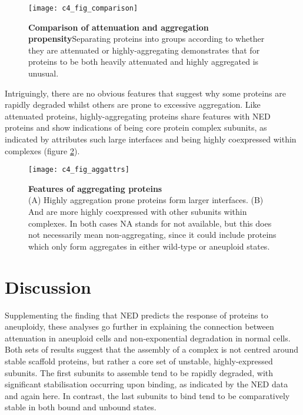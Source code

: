 \documentclass[a4paper,11pt,twoside,openright]{scrbook}
\begin{document}
\begin{figure}[h]
\fcapsideright
    {\caption[Comparison of attenuation and aggregation propensity]{\sffamily\textbf{Comparison of attenuation and aggregation propensity}\newline \small Separating proteins into groups according to whether they are attenuated or highly-aggregating demonstrates that for proteins to be both heavily attenuated and highly aggregated is unusual.}\label{figure:aneuploidy_comparison}}
    {\texttt{[image: c4\_fig\_comparison]}}
\end{figure}

Intriguingly, there are no obvious features that suggest why some proteins are rapidly degraded whilst others are prone to excessive aggregation. Like attenuated proteins, highly-aggregating proteins share features with NED proteins and show indications of being core protein complex subunits, as indicated by attributes such large interfaces and being highly coexpressed within complexes (figure \ref{figure:aneuploidy_aggattrs}).

\begin{figure}[h]
    \texttt{[image: c4\_fig\_aggattrs]}
    \caption[Features of aggregating proteins]{\sffamily \textbf{Features of aggregating proteins} \\ \small (A) Highly aggregation prone proteins form larger interfaces. (B) And are more highly coexpressed with other subunits within complexes. In both cases NA stands for not available, but this does not necessarily mean non-aggregating, since it could include proteins which only form aggregates in either wild-type or aneuploid states.}
    \label{figure:aneuploidy_aggattrs}
\end{figure}


\section{Discussion}
Supplementing the finding that NED predicts the response of proteins to aneuploidy, these analyses go further in explaining the connection between attenuation in aneuploid cells and non-exponential degradation in normal cells. Both sets of results suggest that the assembly of a complex is not centred around stable scaffold proteins, but rather a core set of unstable, highly-expressed subunits. The first subunits to assemble tend to be rapidly degraded, with significant stabilisation occurring upon binding, as indicated by the NED data and again here. In contrast, the last subunits to bind tend to be comparatively stable in both bound and unbound states.
\end{document}
